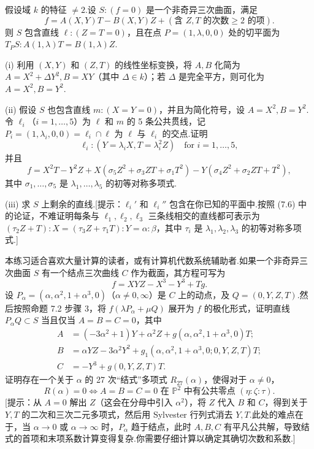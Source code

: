 \begin{exercise}[所有直线均为有理线的情形]
假设域 \(k\) 的特征 \(\neq 2\).设 \(S: (f=0)\) 是一个非奇异三次曲面，满足
\[
f = A(X,Y)T - B(X,Y)Z + (\text{含 } Z,T \text{ 的次数} \ge 2 \text{ 的项}).
\]
则 \(S\) 包含直线 \(\ell: (Z=T=0)\)，且在点 \(P=(1,\lambda,0,0)\) 处的切平面为 \(T_PS: A(1,\lambda)T = B(1,\lambda)Z\).

(i) 利用 \((X,Y)\) 和 \((Z,T)\) 的线性坐标变换，将 \(A,B\) 化简为 \(A=X^2+\Delta Y^2, B=XY\)（其中 \(\Delta \in k\)）；若 \(\Delta\) 是完全平方，则可化为 \(A=X^2, B=Y^2\).

(ii) 假设 \(S\) 也包含直线 \(m: (X=Y=0)\)，并且为简化符号，设 \(A=X^2, B=Y^2\).令 \(\ell_i\)（\(i=1,\dots,5\)）为 \(\ell\) 和 \(m\) 的 5 条公共贯线，记 \(P_i = (1, \lambda_i, 0, 0) = \ell_i \cap \ell\) 为 \(\ell\) 与 \(\ell_i\) 的交点.证明
\[
\ell_i: (Y = \lambda_i X, T = \lambda_i^2 Z) \quad \text{for } i=1,\dots,5,
\]
并且
\[
f = X^2T - Y^2Z + X(\sigma_5 Z^2 + \sigma_3 ZT + \sigma_1 T^2) - Y(\sigma_4 Z^2 + \sigma_2 ZT + T^2),
\]
其中 \(\sigma_1, \dots, \sigma_5\) 是 \(\lambda_1, \dots, \lambda_5\) 的初等对称多项式.

(iii) 求 \(S\) 上剩余的直线.[提示：\(\ell_i'\) 和 \(\ell_i''\) 包含在你已知的平面中.按照 (7.6) 中的论证，不难证明每条与 \(\ell_1, \ell_2, \ell_3\) 三条线相交的直线都可表示为 \((\tau_2 Z+T):X = (\tau_3 Z+\tau_1 T):Y = \alpha:\beta\)，其中 \(\tau_i\) 是 \(\lambda_1, \lambda_2, \lambda_3\) 的初等对称多项式.]
\end{exercise}

\begin{exercise}
本练习适合喜欢大量计算的读者，或有计算机代数系统辅助者.如果一个非奇异三次曲面 \(S\) 有一个结点三次曲线 \(C\) 作为截面，其方程可写为
\[
f = XYZ - X^3 - Y^3 + Tg.
\]
设 \(P_\alpha = (\alpha, \alpha^2, 1+\alpha^3, 0)\)（\(\alpha \neq 0, \infty\)）是 \(C\) 上的动点，及 \(Q=(0,Y,Z,T)\).然后按照命题 7.2 步骤 3，将 \(f(\lambda P_\alpha + \mu Q)\) 展开为 \(f\) 的极化形式，证明直线 \(P_\alpha Q \subset S\) 当且仅当 \(A=B=C=0\)，其中
\begin{align*}
A &= (-3\alpha^2+1)Y + \alpha^2 Z + g(\alpha, \alpha^2, 1+\alpha^3, 0)T; \\
B &= \alpha YZ - 3\alpha^2 Y^2 + g_1(\alpha, \alpha^2, 1+\alpha^3, 0; 0,Y,Z,T)T; \\
C &= -Y^3 + g(0,Y,Z,T)T.
\end{align*}
证明存在一个关于 \(\alpha\) 的 27 次“结式”多项式 \(R_{27}(\alpha)\)，使得对于 \(\alpha \neq 0\)，
\[
R(\alpha) = 0 \iff A=B=C=0 \text{ 在 } {\mathbb{P}}^{2} \text{ 中有公共零点 } (\eta:\zeta:\tau).
\]
[提示：从 \(A=0\) 解出 \(Z\)（这会在分母中引入 \(\alpha^2\)），将 \(Z\) 代入 \(B\) 和 \(C\)，得到关于 \(Y,T\) 的二次和三次二元多项式，然后用 Sylvester 行列式消去 \(Y,T\).此处的难点在于，当 \(\alpha \to 0\) 或 \(\alpha \to \infty\) 时，\(P_\alpha\) 趋于结点，此时 \(A,B,C\) 有平凡公共解，导致结式的首项和末项系数计算变得复杂.你需要仔细计算以确定其确切次数和系数.]
\end{exercise}
